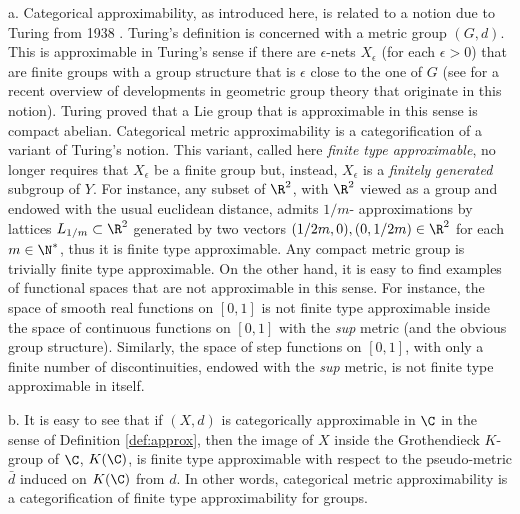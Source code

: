 \begin{rem}\label{rem:turing} a. Categorical approximability, as introduced here, is related to a notion due to Turing from 1938 \cite{Turing:approx}. Turing's definition is concerned with a metric group $(G,d)$. This is approximable in Turing's sense if there are  $\epsilon$-nets  $X_{\epsilon}$ (for each $\epsilon>0$) that are finite groups with a group structure that is $\epsilon$ close to the one of $G$  (see \cite{Thom:approx} for a recent overview of developments in geometric group theory that originate in this notion). Turing proved that a Lie group that is approximable in this sense is compact abelian.
Categorical metric approximability  is a categorification of a  variant of Turing's notion.  This variant, called here {\em finite type approximable},   no longer  requires that  $X_{\epsilon}$ be a finite group but,
instead, $X_{\epsilon}$ is a {\em finitely generated} subgroup of $Y$. For instance, any subset of $\R^{2}$, with $\R^{2}$ viewed as a group and endowed with the usual euclidean distance,  admits $1/m$- approximations by lattices $L_{1/m}\subset \R^{2}$ generated by two vectors $(1/2m,0), (0,1/2m)\in\R^{2}$ for each $m\in \N^{*}$, thus it is finite type approximable. Any compact metric group is trivially finite type approximable. On the other hand, it is easy to find examples of functional spaces that are not  approximable in this sense. For instance, the space of smooth real functions on $[0,1]$ is not finite type approximable inside the space of continuous functions on $[0,1]$ with the {\em sup} metric (and the obvious group structure). Similarly, the space of step functions on $[0,1]$, with only a finite number of discontinuities, endowed with the {\em sup} metric, is not finite type approximable in itself. 

b. It is easy to see that if $(X,d)$ is  categorically approximable in $\C$ in the sense of Definition \ref{def:approx}, then the image of $X$ inside the Grothendieck $K$-group of $\C$, $K(\C)$, is finite type approximable with respect to the pseudo-metric $\bar{d}$  induced on $K(\C)$ from $d$. In other words,
categorical metric approximability is a categorification of finite type approximability for groups.


\end{rem}
